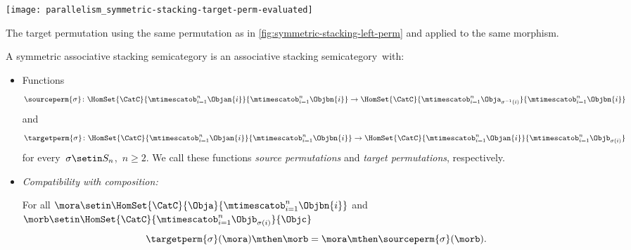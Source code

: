 \begin{marginfigure}
    \centering
    \texttt{[image: parallelism\_symmetric-stacking-target-perm-evaluated]}
    \caption{The target permutation using the same permutation as in \cref{fig:symmetric-stacking-left-perm} and applied to the same morphism.}
    \label{fig:symmetric-stacking-target-perm}
\end{marginfigure}

\begin{ctdefinition}
    \label{def:symmetric-stacking-category}
    A symmetric associative stacking semicategory is an associative stacking semicategory~\CatC with:

    \constit

    \begin{itemize}
        \item Functions
              \begin{equation}
                  \sourceperm{\sigma} \colon \HomSet{\CatC}{\mtimescatob_{i=1}^n \Objan{i}}{\mtimescatob_{i=1}^n \Objbn{i}} \to \HomSet{\CatC}{\mtimescatob_{i=1}^n \Obja_{\sigma^{-1}(i)}}{\mtimescatob_{i=1}^n \Objbn{i}}
              \end{equation}
              and
              \begin{equation}
                  \targetperm{\sigma} \colon \HomSet{\CatC}{\mtimescatob_{i=1}^n \Objan{i}}{\mtimescatob_{i=1}^n \Objbn{i}} \to \HomSet{\CatC}{\mtimescatob_{i=1}^n \Objan{i}}{\mtimescatob_{i=1}^n \Objb_{\sigma(i)}}
              \end{equation}
              for every~$\sigma \setin S_n$,~$n \geq 2$.
              We call these functions \emph{source permutations} and \emph{target permutations}, respectively.
    \end{itemize}

    \condit

    \begin{itemize}

        \item \emph{Compatibility with composition:}

              For all $\mora \setin \HomSet{\CatC}{\Obja}{\mtimescatob_{i=1}^n \Objbn{i}}$ and $\morb \setin \HomSet{\CatC}{\mtimescatob_{i=1}^n \Objb_{\sigma(i)}}{\Objc}$
              \begin{equation}
                  \label{eq:perm-compatibility-with-composition}
                  \targetperm{\sigma} (\mora) \mthen \morb = \mora \mthen \sourceperm{\sigma}(\morb).
              \end{equation}


\end{itemize}
\end{ctdefinition}
